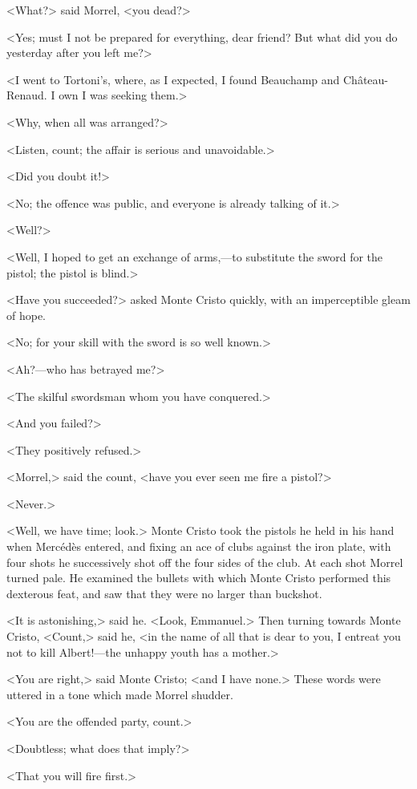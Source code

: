  <What?> said Morrel, <you dead?> 

 <Yes; must I not be prepared for everything, dear friend? But what did you do yesterday after you left me?> 

 <I went to Tortoni's, where, as I expected, I found Beauchamp and Château-Renaud. I own I was seeking them.> 

 <Why, when all was arranged?> 

 <Listen, count; the affair is serious and unavoidable.> 

 <Did you doubt it!> 

 <No; the offence was public, and everyone is already talking of it.> 

 <Well?> 

 <Well, I hoped to get an exchange of arms,—to substitute the sword for the pistol; the pistol is blind.> 

 <Have you succeeded?> asked Monte Cristo quickly, with an imperceptible gleam of hope. 

 <No; for your skill with the sword is so well known.> 

 <Ah?—who has betrayed me?> 

 <The skilful swordsman whom you have conquered.> 

 <And you failed?> 

 <They positively refused.> 

 <Morrel,> said the count, <have you ever seen me fire a pistol?> 

 <Never.> 

 <Well, we have time; look.> Monte Cristo took the pistols he held in his hand when Mercédès entered, and fixing an ace of clubs against the iron plate, with four shots he successively shot off the four sides of the club. At each shot Morrel turned pale. He examined the bullets with which Monte Cristo performed this dexterous feat, and saw that they were no larger than buckshot. 

 <It is astonishing,> said he. <Look, Emmanuel.> Then turning towards Monte Cristo, <Count,> said he, <in the name of all that is dear to you, I entreat you not to kill Albert!—the unhappy youth has a mother.> 

 <You are right,> said Monte Cristo; <and I have none.> These words were uttered in a tone which made Morrel shudder. 

 <You are the offended party, count.> 

 <Doubtless; what does that imply?> 

 <That you will fire first.> 

